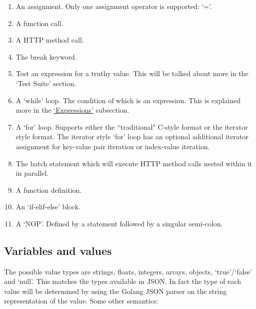 \documentclass[12pt, letterpaper]{article}
\begin{document}
\begin{center}
    \begin{enumerate}
        \item An assignment. Only one assignment operator is supported: `='.
        \item A function call.
        \item A HTTP method call.
        \item The break keyword.
        \item Test an expression for a truthy value. This will be talked about more in the `Test Suite' section.
        \item A `while' loop. The condition of which is an expression. This is explained more in the \hyperref[sec:expressions]{`Expressions'} subsection.
        \item A `for' loop. Supports either the ``traditional" C-style format or the iterator style format. The iterator style `for' loop has an optional additional iterator assignment for key-value pair iteration or index-value iteration.
        \item The batch statement which will execute HTTP method calls nested within it in parallel.
        \item A function definition.
        \item An `if-elif-else' block.
        \item A `NOP'. Defined by a statement followed by a singular semi-colon.
    \end{enumerate}
\end{center}

\subsection{Variables and values}

The possible value types are strings, floats, integers, arrays, objects, `true'/`false' and `null'. This matches the types available in JSON. In fact the type of each value will be determined by using the Golang JSON parser on the string representation of the value. Some other semantics:
\end{document}
